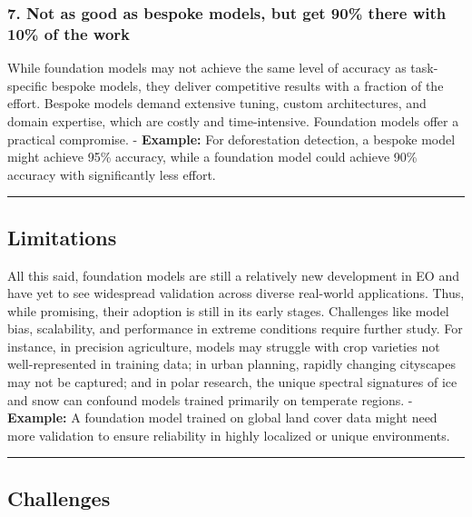 \documentclass[
  letterpaper,
  DIV=11,
  numbers=noendperiod]{scrreprt}
\begin{document}
\subsubsection{\texorpdfstring{\textbf{7. Not as good as bespoke models,
but get 90\% there with 10\% of the
work}}{7. Not as good as bespoke models, but get 90\% there with 10\% of the work}}\label{not-as-good-as-bespoke-models-but-get-90-there-with-10-of-the-work}

While foundation models may not achieve the same level of accuracy as
task-specific bespoke models, they deliver competitive results with a
fraction of the effort. Bespoke models demand extensive tuning, custom
architectures, and domain expertise, which are costly and
time-intensive. Foundation models offer a practical compromise. -
\textbf{Example:} For deforestation detection, a bespoke model might
achieve 95\% accuracy, while a foundation model could achieve 90\%
accuracy with significantly less effort.

\begin{center}\rule{0.5\linewidth}{0.5pt}\end{center}

\subsection{Limitations}\label{limitations}

All this said, foundation models are still a relatively new development
in EO and have yet to see widespread validation across diverse
real-world applications. Thus, while promising, their adoption is still
in its early stages. Challenges like model bias, scalability, and
performance in extreme conditions require further study. For instance,
in precision agriculture, models may struggle with crop varieties not
well-represented in training data; in urban planning, rapidly changing
cityscapes may not be captured; and in polar research, the unique
spectral signatures of ice and snow can confound models trained
primarily on temperate regions. - \textbf{Example:} A foundation model
trained on global land cover data might need more validation to ensure
reliability in highly localized or unique environments.

\begin{center}\rule{0.5\linewidth}{0.5pt}\end{center}

\subsection{Challenges}\label{challenges}
\end{document}
